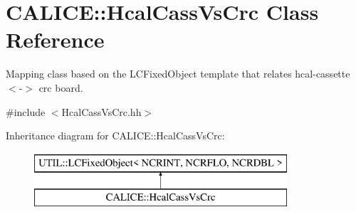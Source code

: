 \section{C\-A\-L\-I\-C\-E\-:\-:Hcal\-Cass\-Vs\-Crc Class Reference}
\label{classCALICE_1_1HcalCassVsCrc}


Mapping class based on the L\-C\-Fixed\-Object template that relates hcal-\/cassette $<$-\/$>$ crc board.  




{\ttfamily \#include $<$Hcal\-Cass\-Vs\-Crc.\-hh$>$}

Inheritance diagram for C\-A\-L\-I\-C\-E\-:\-:Hcal\-Cass\-Vs\-Crc\-:\begin{figure}[H]
\begin{center}
\leavevmode
\includegraphics[height=2.000000cm]{classCALICE_1_1HcalCassVsCrc}
\end{center}
\end{figure}
